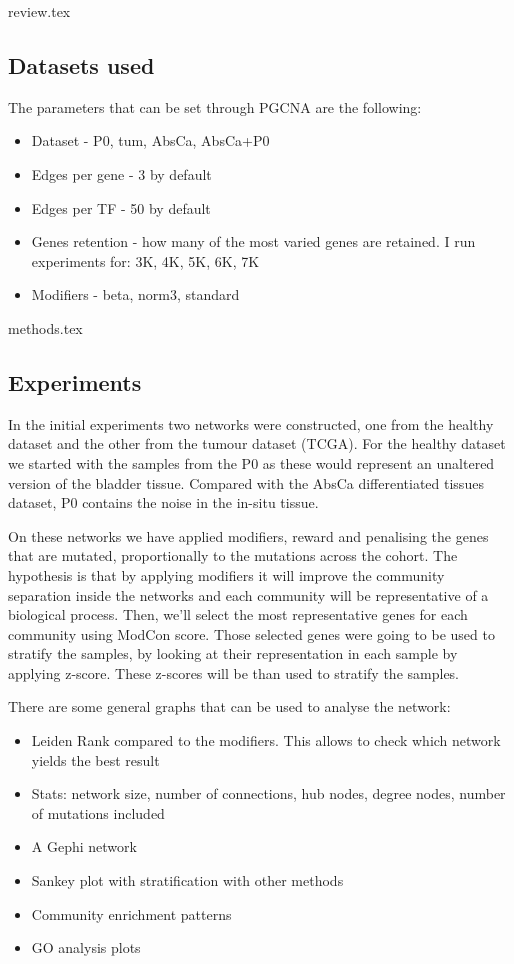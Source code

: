 {review.tex}


\subsection{Datasets used}


The parameters that can be set through PGCNA are the following:
\begin{itemize}
    \item Dataset - P0, tum, AbsCa, AbsCa+P0
    \item Edges per gene - 3 by default
    \item Edges per TF - 50 by default
    \item Genes retention - how many of the most varied genes are retained. I run experiments for: 3K, 4K, 5K, 6K, 7K
    \item Modifiers - beta, norm3, standard
\end{itemize}


{methods.tex}

\newpage

\subsection{Experiments}


In the initial experiments two networks were constructed, one from the healthy dataset and the other from the tumour dataset (TCGA). For the healthy dataset we started with the samples from the P0 as these would represent an unaltered version of the bladder tissue. Compared with the AbsCa differentiated tissues dataset, P0 contains the noise in the in-situ tissue.

On these networks we have applied modifiers, reward and penalising the genes that are mutated, proportionally to the mutations across the cohort. The hypothesis is that by applying modifiers it will improve the community separation inside the networks and each community will be representative of a biological process. Then, we'll select the most representative genes for each community using ModCon score. Those selected genes were going to be used to stratify the samples, by looking at their representation in each sample by applying z-score. These z-scores will be than used to stratify the samples.


There are some general graphs that can be used to analyse the network:
\begin{itemize}
    \item Leiden Rank compared to the modifiers. This allows to check which network yields the best result
    \item Stats: network size, number of connections, hub nodes, degree nodes, number of mutations included
    \item A Gephi network
    \item Sankey plot with stratification with other methods
    \item Community enrichment patterns
    \item GO analysis plots
\end{itemize}


